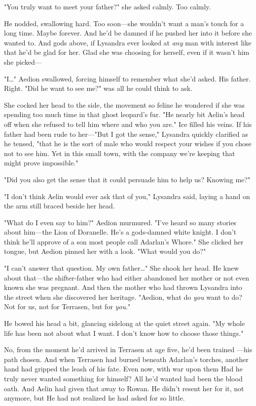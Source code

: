 "You truly want to meet your father?" she asked calmly. Too calmly.

He nodded, swallowing hard. Too soon---she wouldn't want a man's touch for a long time. Maybe forever. And he'd be damned if he pushed her into it before she wanted to. And gods above, if Lysandra ever looked at
\emph{any} man with interest like that  he'd be glad for her. Glad she was choosing for herself, even if it wasn't him she picked---

"I\ldots" Aedion swallowed, forcing himself to remember what she'd asked. His father. Right. "Did he want to see me?" was all he could think to ask.

She cocked her head to the side, the movement so feline he wondered if she was spending too much time in that ghost leopard's fur. "He nearly bit Aelin's head off when she refused to tell him where and who you are." Ice filled his veins. If his father had been rude to her---"But I got the sense," Lysandra quickly clarified as he tensed, "that he is the sort of male who would respect your wishes if you chose not to see him. Yet in this small town, with the company we're keeping 
that might prove impossible."

"Did you also get the sense that it could persuade him to help us? Knowing me?"

"I don't think Aelin would ever ask that of you," Lysandra said, laying a hand on the arm still braced beside her head.

"What do I even say to him?" Aedion murmured. "I've heard so many stories about him---the Lion of Doranelle. He's a gods-damned white knight. I don't think he'll approve of a son most people call Adarlan's Whore." She clicked her tongue, but Aedion pinned her with a look. "What would you do?"

"I can't answer that question. My own father\ldots" She shook her head. He knew about that---the shifter-father who had either abandoned her mother or not even known she was pregnant. And then the mother who had thrown Lysandra into the street when she discovered her heritage. "Aedion, what do \emph{you} want to do? Not for us, not for Terrasen, but for \emph{you}."

He bowed his head a bit, glancing sidelong at the quiet street again. "My whole life has been  not about what I want. I don't know how to choose those things."

No, from the moment he'd arrived in Terrasen at age five, he'd been trained ---his path chosen. And when Terrasen had burned beneath Adarlan's torches, another hand had gripped the leash of his fate. Even now, with war upon them  Had he truly never wanted something for himself? All he'd wanted had been the blood oath. And Aelin had given that away to Rowan. He didn't resent her for it, not anymore, but
 He had not realized he had asked for so little.

